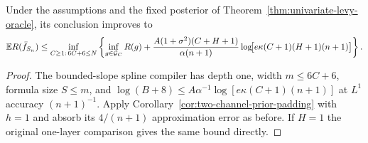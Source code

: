 \begin{corollary}
\label{cor:univariate-additive-depth}
Under the assumptions and the fixed posterior of
Theorem~\ref{thm:univariate-levy-oracle}, its conclusion improves to
\begin{equation}
 \mathbb E R(\bar f_{S_n})
 \le\inf_{\substack{C\ge1:\,6C+6\le N}}
 \left\{\inf_{g\in\mathcal G_C}R(g)
 +\frac{A(1+\sigma^2)(C+H+1)}{\alpha(n+1)}
       \log\!\bigl[e\kappa(C+1)(H+1)(n+1)\bigr]\right\}.
 \label{eq:univariate-additive-depth}
\end{equation}
\end{corollary}
\begin{proof}
The bounded-slope spline compiler has depth one, width
$m\le6C+6$, formula size $S\le m$, and
$\log(B+8)\le A\alpha^{-1}
\log[e\kappa(C+1)(n+1)]$ at $L^1$ accuracy $(n+1)^{-1}$.
Apply Corollary~\ref{cor:two-channel-prior-padding} with $h=1$ and
absorb its $4/(n+1)$ approximation error as before. If $H=1$ the
original one-layer comparison gives the same bound directly.
\end{proof}

